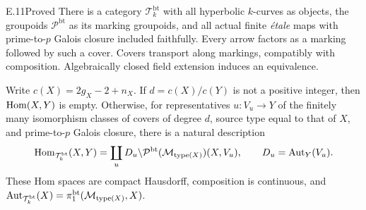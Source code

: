 \begin{claim}{E.11}{Proved}
There is a category $\mathcal T_k^{\mathrm{bt}}$ with all
hyperbolic $k$-curves as objects, the groupoids
$\mathcal P^{\mathrm{bt}}$ as its marking groupoids, and all
actual finite \emph{\'etale} maps with prime-to-$p$ Galois
closure included faithfully. Every arrow factors as a marking
followed by such a cover. Covers transport along markings,
compatibly with composition. Algebraically closed field
extension induces an equivalence.

Write $c(X)=2g_X-2+n_X$. If $d=c(X)/c(Y)$ is not a positive
integer, then $\operatorname{Hom}(X,Y)$ is empty. Otherwise, for representatives
$u:V_u\to Y$ of the finitely many isomorphism classes of covers
of degree $d$, source type equal to that of $X$, and prime-to-$p$
Galois closure, there is a natural description
\[
 \operatorname{Hom}_{\mathcal T_k^{\mathrm{bt}}}(X,Y)
  =\coprod_u D_u\backslash
  \mathcal P^{\mathrm{bt}}(\mathcal M_{\mathrm{type}(X)})(X,V_u),
 \qquad D_u=\operatorname{Aut}_Y(V_u).
\]
These Hom spaces are compact Hausdorff, composition is continuous,
and $\operatorname{Aut}_{\mathcal T_k^{\mathrm{bt}}}(X)
=\pi_1^{\mathrm{bt}}(\mathcal M_{\mathrm{type}(X)},X)$.
\end{claim}
